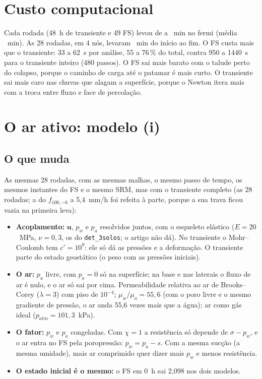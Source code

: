 \documentclass[11pt,a4paper]{article}
\begin{document}
\section{Custo computacional}\label{sec:custo}
\begin{table}[H]\centering\small
\caption{Custo por rodada no fermi (Xeon Silver 4116; 7 rodadas por nó, 3 threads cada): os passos e o tempo do
transiente de 48~h, as análises do fator, o tempo por FS (média e mínimo--máximo) e o tempo total (s).}\label{tab:custo}
\resizebox{0.8\textwidth}{!}{}
\end{table}

Cada rodada (48~h de transiente e 49 FS) levou de \custoMin{} a \custoMax{}~min no fermi (média \custoMedio~min).
As 28 rodadas, em 4 nós, levaram \campanha~min do início ao fim. O FS custa mais que o transiente: 33 a 62~s por
análise, 55 a 76\,\% do total, contra 950 a 1440~s para o transiente inteiro (480 passos). O FS sai mais barato
com o talude perto do colapso, porque o caminho de carga até o patamar é mais curto. O transiente sai mais caro nas
chuvas que alagam a superfície, porque o Newton itera mais com a troca entre fluxo e face de percolação.

\section{O ar ativo: modelo (i)}\label{sec:ar}
\subsection{O que muda}
As mesmas 28 rodadas, com as mesmas malhas, o mesmo passo de tempo, os mesmos instantes do FS e o mesmo SRM, mas com o
transiente completo (as 28 rodadas; a do $f_{100,-6}$ a 5,4~mm/h foi refeita à parte, porque a sua trava ficou vazia na
primeira leva):
\begin{itemize}
  \item \textbf{Acoplamento:} $\mathbf u$, $p_w$ e $p_a$ resolvidos juntos, com o esqueleto elástico ($E = 20$~MPa,
    $\nu = 0{,}3$, os do \texttt{det\_3solos}; o artigo não dá). No transiente o Mohr--Coulomb tem $c' = 10^9$: ele só
    dá as pressões e a deformação. O transiente parte do estado geostático (o peso com as pressões iniciais).
  \item \textbf{O ar:} $p_a$ livre, com $p_a = 0$ só na superfície; na base e nas laterais o fluxo de ar é nulo, e o ar
    só sai por cima. Permeabilidade relativa ao ar de Brooks--Corey ($\lambda = 3$) com piso de $10^{-4}$;
    $\mu_w/\mu_a = 55{,}6$ (com o poro livre e o mesmo gradiente de pressão, o ar anda 55,6 vezes mais que a água);
    ar como gás ideal ($p_{atm} = 101{,}3$~kPa).
  \item \textbf{O fator:} $p_w$ e $p_a$ congeladas. Com $\chi = 1$ a resistência só depende de $\sigma - p_w$, e o ar
    entra no FS pela poropressão: $p_w = p_a - s$. Com a mesma sucção (a mesma umidade), mais ar comprimido quer dizer
    mais $p_w$ e menos resistência.
  \item \textbf{O estado inicial é o mesmo:} o FS em 0~h sai 2,098 nos dois modelos.
\end{itemize}
\end{document}
